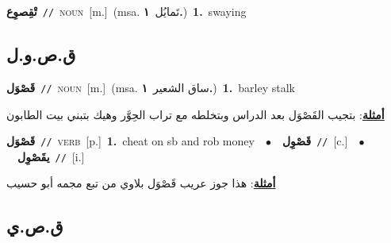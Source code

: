 \documentclass[10pt,a4paper,twoside]{article} %
\begin{document}
\begin{multicols}{2}
{\setlength\topsep{0pt}\textbf{\foreignlanguage{arabic}{تْقِصوِع}}\ {\color{gray}\texttt{//}\color{black}}\ \textsc{noun}\ [m.]\ \color{gray}(msa. \foreignlanguage{arabic}{تَمايُل}~\foreignlanguage{arabic}{\textbf{١.}})\color{black}\ \textbf{1.}~swaying\ } \vspace{2mm}

\vspace{-3mm}
\subsection*{\color{blue}\foreignlanguage{arabic}{ق.ص.و.ل}\color{blue}{}} 

{\setlength\topsep{0pt}\textbf{\foreignlanguage{arabic}{قَصْوَل}}\ {\color{gray}\texttt{//}\color{black}}\ \textsc{noun}\ [m.]\ \color{gray}(msa. \foreignlanguage{arabic}{ساق الشعير}~\foreignlanguage{arabic}{\textbf{١.}})\color{black}\ \textbf{1.}~barley stalk\  \begin{flushright}\color{gray}\foreignlanguage{arabic}{\textbf{\underline{\foreignlanguage{arabic}{أمثلة}}}: بتجيب القَصْوَل بعد الدراس وبتخلطه مع تراب الحِوَّر وهيك بتبني بيت الطابون}\end{flushright}\color{black}} \vspace{2mm}

{\setlength\topsep{0pt}\textbf{\foreignlanguage{arabic}{قَصْوَل}}\ {\color{gray}\texttt{//}\color{black}}\ \textsc{verb}\ [p.]\ \textbf{1.}~cheat on sb and rob money\ \ $\bullet$\ \ \setlength\topsep{0pt}\textbf{\foreignlanguage{arabic}{قَصْوِل}}\ {\color{gray}\texttt{//}\color{black}}\ [c.]\ \ $\bullet$\ \ \setlength\topsep{0pt}\textbf{\foreignlanguage{arabic}{يقَصْوِل}}\ {\color{gray}\texttt{//}\color{black}}\ [i.]\  \begin{flushright}\color{gray}\foreignlanguage{arabic}{\textbf{\underline{\foreignlanguage{arabic}{أمثلة}}}: هذا جوز عريب قَصْوَل بلاوي من تبع مجمه أبو حسيب}\end{flushright}\color{black}} \vspace{2mm}

\vspace{-3mm}
\subsection*{\color{blue}\foreignlanguage{arabic}{ق.ص.ي}\color{blue}{}} 


\end{multicols}
\end{document}
